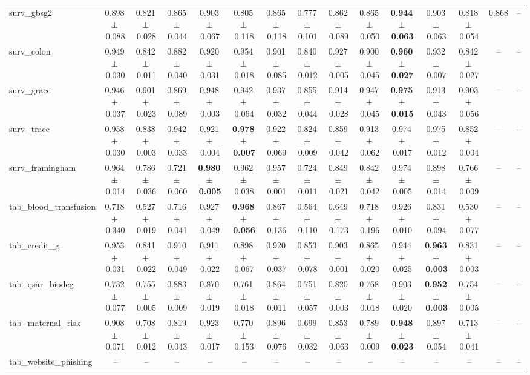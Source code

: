 \documentclass[8pt]{extarticle}
\begin{document}
\begin{longtable}{l*{14}{c}}
surv\_gbsg2 & 0.898\,$\pm$\,0.088 & 0.821\,$\pm$\,0.028 & 0.865\,$\pm$\,0.044 & 0.903\,$\pm$\,0.067 & 0.805\,$\pm$\,0.118 & 0.865\,$\pm$\,0.118 & 0.777\,$\pm$\,0.101 & 0.862\,$\pm$\,0.089 & 0.865\,$\pm$\,0.050 & \textbf{0.944\,$\pm$\,0.063} & 0.903\,$\pm$\,0.063 & 0.818\,$\pm$\,0.054 & 0.868 & -- \\
surv\_colon & 0.949\,$\pm$\,0.030 & 0.842\,$\pm$\,0.011 & 0.882\,$\pm$\,0.040 & 0.920\,$\pm$\,0.031 & 0.954\,$\pm$\,0.018 & 0.901\,$\pm$\,0.085 & 0.840\,$\pm$\,0.012 & 0.927\,$\pm$\,0.005 & 0.900\,$\pm$\,0.045 & \textbf{0.960\,$\pm$\,0.027} & 0.932\,$\pm$\,0.007 & 0.842\,$\pm$\,0.027 & -- & -- \\
surv\_grace & 0.946\,$\pm$\,0.037 & 0.901\,$\pm$\,0.023 & 0.869\,$\pm$\,0.089 & 0.948\,$\pm$\,0.003 & 0.942\,$\pm$\,0.064 & 0.937\,$\pm$\,0.032 & 0.855\,$\pm$\,0.044 & 0.914\,$\pm$\,0.028 & 0.947\,$\pm$\,0.045 & \textbf{0.975\,$\pm$\,0.015} & 0.913\,$\pm$\,0.043 & 0.903\,$\pm$\,0.056 & -- & -- \\
surv\_trace & 0.958\,$\pm$\,0.030 & 0.838\,$\pm$\,0.003 & 0.942\,$\pm$\,0.033 & 0.921\,$\pm$\,0.004 & \textbf{0.978\,$\pm$\,0.007} & 0.922\,$\pm$\,0.069 & 0.824\,$\pm$\,0.009 & 0.859\,$\pm$\,0.042 & 0.913\,$\pm$\,0.062 & 0.974\,$\pm$\,0.017 & 0.975\,$\pm$\,0.012 & 0.852\,$\pm$\,0.004 & -- & -- \\
surv\_framingham & 0.964\,$\pm$\,0.014 & 0.786\,$\pm$\,0.036 & 0.721\,$\pm$\,0.060 & \textbf{0.980\,$\pm$\,0.005} & 0.962\,$\pm$\,0.038 & 0.957\,$\pm$\,0.001 & 0.724\,$\pm$\,0.011 & 0.849\,$\pm$\,0.021 & 0.842\,$\pm$\,0.042 & 0.974\,$\pm$\,0.005 & 0.898\,$\pm$\,0.014 & 0.766\,$\pm$\,0.009 & -- & -- \\
tab\_blood\_transfusion & 0.718\,$\pm$\,0.340 & 0.527\,$\pm$\,0.019 & 0.716\,$\pm$\,0.041 & 0.927\,$\pm$\,0.049 & \textbf{0.968\,$\pm$\,0.056} & 0.867\,$\pm$\,0.136 & 0.564\,$\pm$\,0.110 & 0.649\,$\pm$\,0.173 & 0.718\,$\pm$\,0.196 & 0.926\,$\pm$\,0.010 & 0.831\,$\pm$\,0.094 & 0.530\,$\pm$\,0.077 & -- & -- \\
tab\_credit\_g & 0.953\,$\pm$\,0.031 & 0.841\,$\pm$\,0.022 & 0.910\,$\pm$\,0.049 & 0.911\,$\pm$\,0.022 & 0.898\,$\pm$\,0.067 & 0.920\,$\pm$\,0.037 & 0.853\,$\pm$\,0.078 & 0.903\,$\pm$\,0.001 & 0.865\,$\pm$\,0.020 & 0.944\,$\pm$\,0.025 & \textbf{0.963\,$\pm$\,0.003} & 0.831\,$\pm$\,0.003 & -- & -- \\
tab\_qsar\_biodeg & 0.732\,$\pm$\,0.077 & 0.755\,$\pm$\,0.005 & 0.883\,$\pm$\,0.009 & 0.870\,$\pm$\,0.019 & 0.761\,$\pm$\,0.018 & 0.864\,$\pm$\,0.011 & 0.751\,$\pm$\,0.057 & 0.820\,$\pm$\,0.003 & 0.768\,$\pm$\,0.018 & 0.903\,$\pm$\,0.020 & \textbf{0.952\,$\pm$\,0.003} & 0.754\,$\pm$\,0.005 & -- & -- \\
tab\_maternal\_risk & 0.908\,$\pm$\,0.071 & 0.708\,$\pm$\,0.012 & 0.819\,$\pm$\,0.043 & 0.923\,$\pm$\,0.017 & 0.770\,$\pm$\,0.153 & 0.896\,$\pm$\,0.076 & 0.699\,$\pm$\,0.032 & 0.853\,$\pm$\,0.063 & 0.789\,$\pm$\,0.009 & \textbf{0.948\,$\pm$\,0.023} & 0.897\,$\pm$\,0.054 & 0.713\,$\pm$\,0.041 & -- & -- \\
tab\_website\_phishing & -- & -- & -- & -- & -- & -- & -- & -- & -- & -- & -- & -- & -- & -- \\
\end{longtable}
\end{document}
